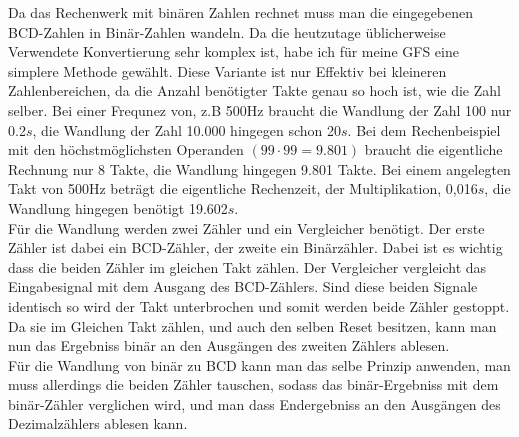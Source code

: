 \documentclass[a4paper,12pt,fleqn,oneside]{article}
\begin{document}
	\noindent	
	Da das Rechenwerk mit binären Zahlen rechnet muss man die eingegebenen BCD-Zahlen in Binär-Zahlen wandeln. Da 
	die heutzutage üblicherweise Verwendete Konvertierung sehr komplex ist, habe ich für meine GFS eine simplere 
	Methode gewählt. Diese Variante ist nur Effektiv bei kleineren Zahlenbereichen, da die Anzahl benötigter Takte 
	genau so hoch ist, wie die Zahl selber. Bei einer Frequnez von, z.B 500Hz braucht die Wandlung der Zahl 100 nur 
	0.2$s$, die Wandlung der Zahl 10.000 hingegen schon 20$s$. Bei dem Rechenbeispiel mit den höchstmöglichsten 
	Operanden $(99 \cdot 99 = 9.801)$ braucht die eigentliche Rechnung nur 8 Takte, die Wandlung hingegen 9.801 
	Takte. Bei einem angelegten Takt von 500Hz beträgt die eigentliche Rechenzeit, der Multiplikation, 0,016$s$, die Wandlung 
	hingegen benötigt 19.602$s$.\\
	Für die Wandlung werden zwei Zähler und ein Vergleicher benötigt. Der erste Zähler ist dabei ein BCD-Zähler, der
	zweite ein Binärzähler. Dabei ist es wichtig dass die beiden Zähler im gleichen Takt zählen. Der Vergleicher 
	vergleicht das Eingabesignal mit dem Ausgang des BCD-Zählers. Sind diese beiden Signale identisch so wird der
	Takt unterbrochen und somit werden beide Zähler gestoppt. Da sie im Gleichen Takt zählen, und auch den selben 
	Reset besitzen, kann man nun das Ergebniss binär an den Ausgängen des zweiten Zählers ablesen.\\
	Für die Wandlung von binär zu BCD kann man das selbe Prinzip anwenden, man muss allerdings die beiden Zähler
	tauschen, sodass das binär-Ergebniss mit dem binär-Zähler verglichen wird, und man dass Endergebniss an den 
	Ausgängen des Dezimalzählers ablesen kann.


\newpage
\end{document}
